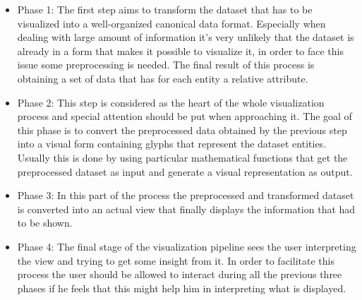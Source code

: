\documentclass[10p,letterpaper]{article}
\begin{document}
\begin{itemize}

\item Phase 1: The first step aims to transform the dataset that has to be visualized into a well-organized canonical data format. Especially when dealing with large amount of information it's very unlikely that the dataset is already in a form that makes it possible to visualize it, in order to face this issue some preprocessing is needed. The final result of this process is obtaining a set of data that has for each entity  a relative attribute.   

\item Phase 2: This step is considered as the heart of the whole visualization process and special attention should be put when approaching it. The goal of this phase is to convert the preprocessed data obtained by the previous step into a visual form containing glyphs that represent the dataset entities. Usually this is done by using particular mathematical functions that get the preprocessed dataset as input and generate a visual representation as output. 

\item Phase 3: In this part of the process the preprocessed and transformed dataset is converted into an actual view that finally displays the information that had to be shown.

\item Phase 4: The final stage of the visualization pipeline sees the user interpreting the view and trying to get some insight from it. In order to facilitate this process the user should be allowed to interact during all the previous three phases if he feels that this might help him in interpreting what is displayed.

\end{itemize}
\end{document}
